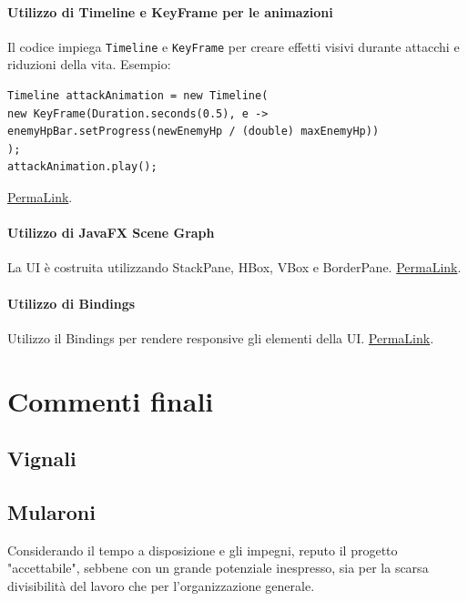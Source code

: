 \documentclass[a4paper,12pt]{report}
\begin{document}
\subsubsection{Utilizzo di Timeline e KeyFrame per le animazioni}
Il codice impiega \texttt{Timeline} e \texttt{KeyFrame} per creare effetti visivi durante attacchi e riduzioni della vita.\newline
Esempio:
\begin{verbatim}
Timeline attackAnimation = new Timeline(
new KeyFrame(Duration.seconds(0.5), e -> enemyHpBar.setProgress(newEnemyHp / (double) maxEnemyHp))
);
attackAnimation.play();
\end{verbatim}
\href{https://github.com/Matt2309/temple-tower/blob/297b37062035f41c3e9258656beace208905a368/src/main/java/it/unibo/templetower/view/CombatView.java#L205}{PermaLink}.

\subsubsection{Utilizzo di JavaFX Scene Graph}
La UI è costruita utilizzando StackPane, HBox, VBox e BorderPane.\newline
\href{https://github.com/Matt2309/temple-tower/blob/297b37062035f41c3e9258656beace208905a368/src/main/java/it/unibo/templetower/view/CombatView.java#L65}{PermaLink}.

\subsubsection{Utilizzo di Bindings}
Utilizzo il Bindings per rendere responsive gli elementi della UI.\newline
\href{https://github.com/Matt2309/temple-tower/blob/297b37062035f41c3e9258656beace208905a368/src/main/java/it/unibo/templetower/view/TreasureView.java#L79}{PermaLink}.

\chapter{Commenti finali}

\section{Vignali}

\section{Mularoni}
Considerando il tempo a disposizione e gli impegni, reputo il progetto "accettabile", sebbene con un grande potenziale inespresso, sia per la scarsa divisibilità del lavoro che per l'organizzazione generale.
\end{document}
